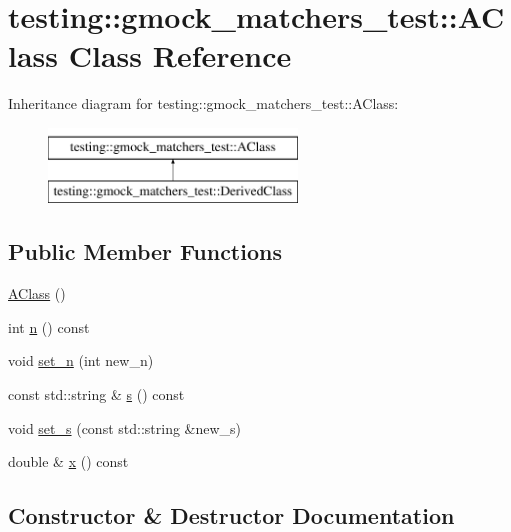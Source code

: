 \hypertarget{classtesting_1_1gmock__matchers__test_1_1AClass}{}\section{testing\+::gmock\+\_\+matchers\+\_\+test\+::A\+Class Class Reference}
\label{classtesting_1_1gmock__matchers__test_1_1AClass}
Inheritance diagram for testing\+::gmock\+\_\+matchers\+\_\+test\+::A\+Class\+:\begin{figure}[H]
\begin{center}
\leavevmode
\includegraphics[height=2.000000cm]{classtesting_1_1gmock__matchers__test_1_1AClass}
\end{center}
\end{figure}
\subsection*{Public Member Functions}
\begin{DoxyCompactItemize}
\item 
\mbox{\hyperlink{classtesting_1_1gmock__matchers__test_1_1AClass_ac43d717a80bb6fad8c77dc36f963ca88}{A\+Class}} ()
\item 
int \mbox{\hyperlink{classtesting_1_1gmock__matchers__test_1_1AClass_add84ab9ef4a6bbe78719a9528bf6fb90}{n}} () const
\item 
void \mbox{\hyperlink{classtesting_1_1gmock__matchers__test_1_1AClass_a3181466cec6faa5ab3c6bc5c4dbf67b2}{set\+\_\+n}} (int new\+\_\+n)
\item 
const std\+::string \& \mbox{\hyperlink{classtesting_1_1gmock__matchers__test_1_1AClass_a1645862d2061ccf04b67761314c7bb97}{s}} () const
\item 
void \mbox{\hyperlink{classtesting_1_1gmock__matchers__test_1_1AClass_a9e2ea4f630928618137cfaadb6298fcf}{set\+\_\+s}} (const std\+::string \&new\+\_\+s)
\item 
double \& \mbox{\hyperlink{classtesting_1_1gmock__matchers__test_1_1AClass_ade61d438cb535d71d0dcc17a1d5bd7cd}{x}} () const
\end{DoxyCompactItemize}


\subsection{Constructor \& Destructor Documentation}
\mbox{\label{classtesting_1_1gmock__matchers__test_1_1AClass_ac43d717a80bb6fad8c77dc36f963ca88}} 
